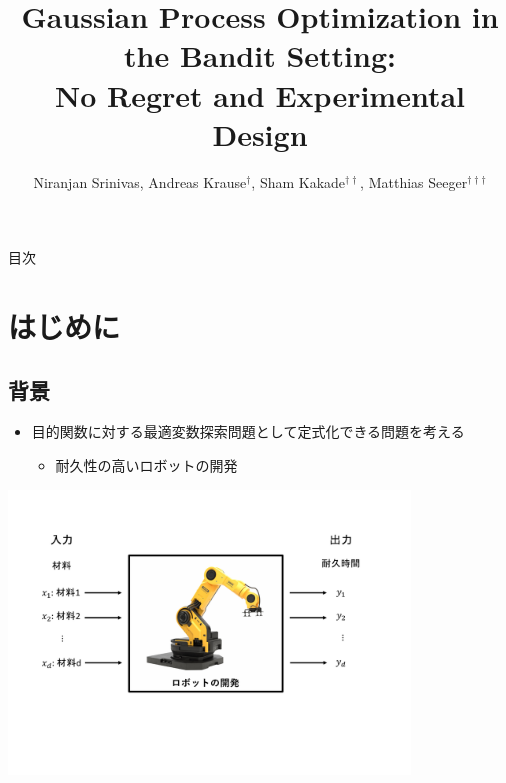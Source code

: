 \documentclass[dvipdfmx, 10.5pt]{beamer}
\title[]{Gaussian Process Optimization in the Bandit Setting:\\No Regret and Experimental Design}
\subtitle{}
\author[]{Niranjan Srinivas, Andreas Krause$^{\dag}$, Sham Kakade$^{\dag\dag}$, Matthias Seeger$^{\dag\dag\dag}$
			\\ \vspace{20pt} \large{\centering{ICML 2020 Test of time Award} \vspace{9pt}}}
\date[\today]{} %
\institute[]{$\dag$: California Institute of Technology\\
$\dag\dag$: University of Pennsylvania\\
$\dag\dag\dag$: Saarland University}
\begin{document}

\begin{frame}
\maketitle%
\thispagestyle{empty}%
\vspace{-6pt}
\end{frame}



\begin{frame}[noframenumbering]{目次}
	\tableofcontents[hideallsubsections]
	\thispagestyle{empty} %
\end{frame}

\section{はじめに}

\subsection{背景}
\begin{frame}{\insertsubsection}
	\begin{itemize}
		\item 目的関数に対する最適変数探索問題として定式化できる問題を考える
		\begin{itemize}
			\item 耐久性の高いロボットの開発
		\end{itemize}
	\end{itemize}
	\vspace{10pt}
	\begin{center}
		\includegraphics[width=0.80\textwidth]{./Fig/Robot.pdf}
	\end{center}
\end{frame}
\end{document}
